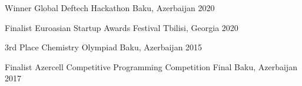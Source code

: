 



\begin{cvhonors}

  \cvhonor
    {Winner} %
    {Global Deftech Hackathon} %
    {Baku, Azerbaijan} %
    {2020} %

  \cvhonor
    {Finalist} %
    {Euroasian Startup Awards Festival} %
    {Tbilisi, Georgia} %
    {2020} %







\end{cvhonors}




\begin{cvhonors}

  \cvhonor
    {3rd Place} %
    {Chemistry Olympiad} %
    {Baku, Azerbaijan} %
    {2015} %



  \cvhonor
    {Finalist} %
    {Azercell Competitive Programming Competition Final} %
    {Baku, Azerbaijan} %
    {2017} %

\end{cvhonors}
